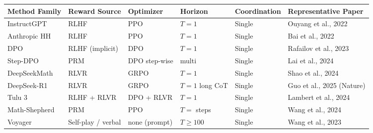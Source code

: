 {\def\LTcaptype{none} %
\begin{longtable}[]{@{}
  >{\raggedright\arraybackslash}p{}
  >{\raggedright\arraybackslash}p{}
  >{\raggedright\arraybackslash}p{}
  >{\raggedright\arraybackslash}p{}
  >{\raggedright\arraybackslash}p{}
  >{\raggedright\arraybackslash}p{}@{}}
\toprule\noalign{}
\begin{minipage}[b]{\linewidth}\raggedright
Method Family
\end{minipage} & \begin{minipage}[b]{\linewidth}\raggedright
Reward Source
\end{minipage} & \begin{minipage}[b]{\linewidth}\raggedright
Optimizer
\end{minipage} & \begin{minipage}[b]{\linewidth}\raggedright
Horizon
\end{minipage} & \begin{minipage}[b]{\linewidth}\raggedright
Coordination
\end{minipage} & \begin{minipage}[b]{\linewidth}\raggedright
Representative Paper
\end{minipage} \\
\midrule\noalign{}
\endhead
\bottomrule\noalign{}
\endlastfoot
InstructGPT & RLHF & PPO & \(T=1\) & Single & Ouyang et al., 2022 \\
Anthropic HH & RLHF & PPO & \(T=1\) & Single & Bai et al., 2022 \\
DPO & RLHF (implicit) & DPO & \(T=1\) & Single & Rafailov et al., 2023 \\
Step-DPO & PRM & DPO step-wise & multi & Single & Lai et al., 2024 \\
DeepSeekMath & RLVR & GRPO & \(T=1\) & Single & Shao et al., 2024 \\
DeepSeek-R1 & RLVR & GRPO & \(T=1\) long CoT & Single & Guo et al., 2025 (Nature) \\
Tulu 3 & RLHF + RLVR & DPO + RLVR & \(T=1\) & Single & Lambert et al., 2024 \\
Math-Shepherd & PRM & PPO & \(T=\) steps & Single & Wang et al., 2024 \\
Voyager & Self-play / verbal & none (prompt) & \(T \ge 100\) & Single & Wang et al., 2023 \\

\end{longtable}}
